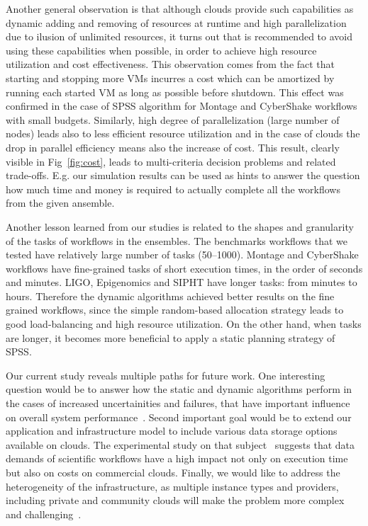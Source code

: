 \documentclass{sig-alternate}
\begin{document}
Another general observation is that although clouds provide such capabilities as
dynamic adding and removing of resources at runtime and high parallelization due
to ilusion of unlimited resources, it turns out that is recommended to avoid
using these capabilities when possible, in order to achieve high resource
utilization and cost effectiveness. This observation comes from the fact that
starting and stopping more VMs incurres a cost which can be amortized by running
each started VM as long as possible before shutdown. This effect was confirmed
in the case of SPSS algorithm for Montage and CyberShake workflows with small
budgets. Similarly, high degree of parallelization (large number of nodes) leads
also to less efficient resource utilization and in the case of clouds the drop
in parallel efficiency means also the increase of cost. This result, clearly
visible in Fig~\ref{fig:cost}, leads to multi-criteria decision problems and
related trade-offs. E.g. our simulation results can be used as hints to answer
the question how much time and money is required to actually complete all the
workflows from the given ansemble.

Another lesson learned from our studies is related to the shapes and granularity
of the tasks of workflows in the ensembles. The benchmarks workflows that we
tested have relatively large number of tasks (50--1000). Montage and CyberShake
workflows have fine-grained tasks of short execution times, in the order of
seconds and minutes. LIGO, Epigenomics and SIPHT have longer tasks: from minutes to hours.
Therefore the dynamic algorithms achieved better results on the fine grained
workflows, since the simple random-based allocation strategy leads to good
load-balancing and high resource utilization. On the other hand, when tasks are
longer, it becomes more beneficial to apply a static planning strategy of SPSS.

Our current study reveals multiple paths for future work. One interesting
question would be to answer how the static and dynamic algorithms perform in the
cases of increased uncertainities and failures, that have important influence
on overall system performance~\cite{Sakellariou2010,Dongarra2007}. Second
important goal would be to extend our application and infrastructure model to
include various data storage options available on clouds. The experimental study
on that subject~\cite{Juve2010} suggests that data demands of scientific
workflows have a high impact not only on execution time but also on costs on
commercial clouds. Finally, we would like to address the heterogeneity of the
infrastructure, as multiple instance types and providers, including private
and community clouds will make the problem more complex and
challenging~\cite{Marshall2010,vockler11,Juve2010}.







\end{document}
